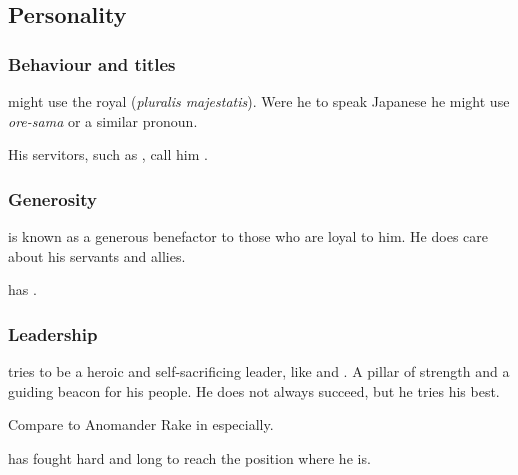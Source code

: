 \subsection{Personality}





\subsubsection{Behaviour and titles}
\Secherdamon{} might use the royal  (\emph{pluralis majestatis}). 
Were he to speak Japanese he might use \emph{ore-sama} or a similar pronoun.

His servitors, such as \LocarPsyrex, call him . 





\subsubsection{Generosity}
\Secherdamon{} is known as a generous benefactor to those who are loyal to him. 
He does care about his servants and allies. 

\Ishnaruchaefir{} has . 





\subsubsection{Leadership}
\Secherdamon{} tries to be a heroic and self-sacrificing leader, like \TyarithXserasshana{} and \Nexagglachel. 
A pillar of strength and a guiding beacon for his people. 
He does not always succeed, but he tries his best. 

Compare to Anomander Rake in \cite{StevenErikson:TolltheHounds} especially. 

\Secherdamon{} has fought hard and long to reach the position where he is. 


